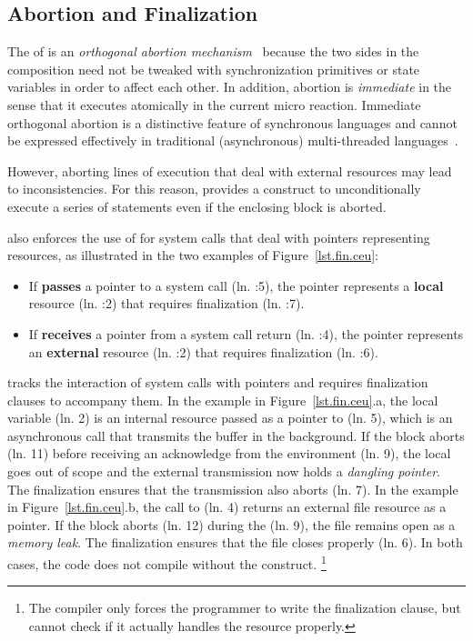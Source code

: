 \subsection{Abortion and Finalization}
\label{sec.ceu.fin}

The  of \CEU is an \emph{orthogonal abortion
mechanism}~\cite{esterel.preemption} because the two sides in the composition
need not be tweaked with synchronization primitives or state variables in order
to affect each other.
%
In addition, abortion is \emph{immediate} in the sense that it executes
atomically in the current micro reaction.
%
Immediate orthogonal abortion is a distinctive feature of synchronous languages
and cannot be expressed effectively in traditional (asynchronous)
multi-threaded languages~\cite{esterel.preemption,sync_async.threadsstop}.

However, aborting lines of execution that deal with external resources may lead
to inconsistencies.
%
For this reason, \CEU provides a  construct to unconditionally
execute a series of statements even if the enclosing block is aborted.

\CEU also enforces the use of  for system calls that deal with
pointers representing resources, as illustrated in the two examples of
Figure~\ref{lst.fin.ceu}:
%
\begin{itemize}
\item If \CEU \textbf{passes} a pointer to a system call (ln. \ax:5), the
pointer represents a \textbf{local} resource (ln. \ax:2) that requires finalization
(ln. \ax:7).
\item If \CEU \textbf{receives} a pointer from a system call return (ln. \bx:4),
the pointer represents an \textbf{external} resource (ln. \bx:2) that requires
finalization (ln. \bx:6).
\end{itemize}
%
\CEU tracks the interaction of system calls with pointers and requires
finalization clauses to accompany them.
%
In the example in Figure~\ref{lst.fin.ceu}.a, the local variable 
(ln. 2) is an internal resource passed as a pointer to 
(ln. 5), which is an asynchronous call that transmits the buffer in the
background.
If the block aborts (ln. 11) before receiving an acknowledge from the
environment (ln. 9), the local  goes out of scope and the external
transmission now holds a \emph{dangling pointer}.
The finalization ensures that the transmission also aborts (ln. 7).
%
In the example in Figure~\ref{lst.fin.ceu}.b, the call to  (ln.
4) returns an external file resource as a pointer.
If the block aborts (ln. 12) during the  (ln. 9), the file
remains open as a \emph{memory leak}.
The finalization ensures that the file closes properly (ln. 6).
%
In both cases, the code does not compile without the 
construct.%
\footnote{
The compiler only forces the programmer to write the finalization clause, but
cannot check if it actually handles the resource properly.
}

